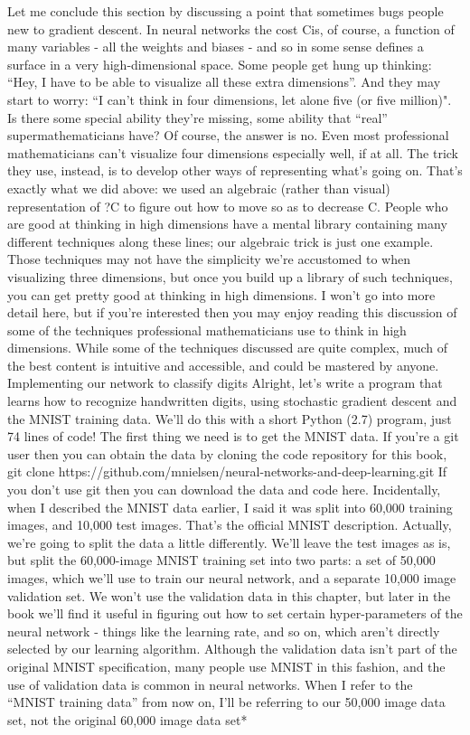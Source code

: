 Let me conclude this section by discussing a point that sometimes bugs people new to gradient descent. In neural networks the cost Cis, of course, a function of many variables - all the weights and biases - and so in some sense defines a surface in a very high-dimensional space. Some people get hung up thinking: ``Hey, I have to be able to visualize all these extra dimensions''. And they may start to worry: ``I can't think in four dimensions, let alone five (or five million)". Is there some special ability they're missing, some ability that ``real'' supermathematicians have? Of course, the answer is no. Even most professional mathematicians can't visualize four dimensions especially well, if at all. The trick they use, instead, is to develop other ways of representing what's going on. That's exactly what we did above: we used an algebraic (rather than visual) representation of ?C to figure out how to move so as to decrease C. People who are good at thinking in high dimensions have a mental library containing many different techniques along these lines; our algebraic trick is just one example. Those techniques may not have the simplicity we're accustomed to when visualizing three dimensions, but once you build up a library of such techniques, you can get pretty good at thinking in high dimensions. I won't go into more detail here, but if you're interested then you may enjoy reading this discussion of some of the techniques professional mathematicians use to think in high dimensions. While some of the techniques discussed are quite complex, much of the best content is intuitive and accessible, and could be mastered by anyone.
Implementing our network to classify digits
Alright, let's write a program that learns how to recognize handwritten digits, using stochastic gradient descent and the MNIST training data. We'll do this with a short Python (2.7) program, just 74 lines of code! The first thing we need is to get the MNIST data. If you're a git user then you can obtain the data by cloning the code repository for this book,
git clone https://github.com/mnielsen/neural-networks-and-deep-learning.git
If you don't use git then you can download the data and code here.
Incidentally, when I described the MNIST data earlier, I said it was split into 60,000 training images, and 10,000 test images. That's the official MNIST description. Actually, we're going to split the data a little differently. We'll leave the test images as is, but split the 60,000-image MNIST training set into two parts: a set of 50,000 images, which we'll use to train our neural network, and a separate 10,000 image validation set. We won't use the validation data in this chapter, but later in the book we'll find it useful in figuring out how to set certain hyper-parameters of the neural network - things like the learning rate, and so on, which aren't directly selected by our learning algorithm. Although the validation data isn't part of the original MNIST specification, many people use MNIST in this fashion, and the use of validation data is common in neural networks. When I refer to the ``MNIST training data'' from now on, I'll be referring to our 50,000 image data set, not the original 60,000 image data set* 


